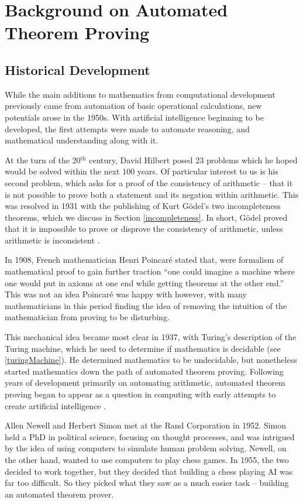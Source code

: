 \chapter{Background on Automated Theorem Proving}

\section{Historical Development}

While the main additions to mathematics from computational development previously came from automation of basic operational calculations, new potentials arose in the 1950s. With artificial intelligence beginning to be developed, the first attempts were made to automate reasoning, and mathematical understanding along with it.

At the turn of the 20$^{\text{th}}$ century, David Hilbert posed 23 problems which he hoped would be solved within the next 100 years. Of particular interest to us is his second problem, which asks for a proof of the consistency of arithmetic -- that it is not possible to prove both a statement and its negation within arithmetic. This was resolved in 1931 with the publishing of Kurt G\"odel's two incompleteness theorems, which we discuss in Section \ref{incompleteness}. In short, G\"odel proved that it is impossible to prove or disprove the consistency of arithmetic, unless arithmetic is inconsistent \cite{godel}.

In 1908, French mathematician Henri Poincar\'e stated that, were formalism of mathematical proof to gain further traction ``one could imagine a machine where one would put in axioms at one end while getting theorems at the other end.'' This was not an idea Poincar\'e was happy with however, with many mathematicians in this period finding the idea of removing the intuition of the mathematician from proving to be disturbing.

This mechanical idea became most clear in 1937, with Turing's description of the Turing machine, which he used to determine if mathematics is decidable (see \ref{turingMachine}). He determined mathematics to be undecidable, but nonetheless started mathematics down the path of automated theorem proving. Following years of development primarily on automating arithmetic, automated theorem proving began to appear as a question in computing with early attempts to create artificial intelligence \cite{history}.

Allen Newell and Herbert Simon met at the Rand Corporation in 1952. Simon held a PhD in political science, focusing on thought processes, and was intrigued by the idea of using computers to simulate human problem solving. Newell, on the other hand, wanted to use computers to play chess games. In 1955, the two decided to work together, but they decided that building a chess playing AI was far too difficult. So they picked what they saw as a much easier task -- building an automated theorem prover.

